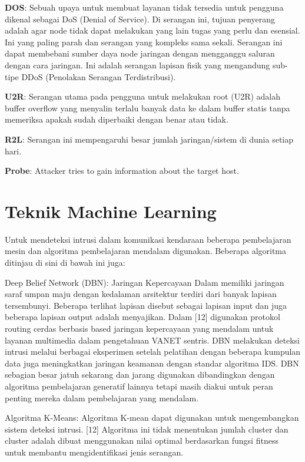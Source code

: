 \documentclass[conference]{IEEEtran}
\begin{document}
\textbf{DOS}: Sebuah upaya untuk membuat layanan
tidak tersedia untuk pengguna dikenal sebagai DoS (Denial of Service). Di
serangan ini, tujuan penyerang adalah agar node tidak dapat melakukan yang lain
tugas yang perlu dan esensial. Ini yang paling parah dan
serangan yang kompleks sama sekali. Serangan ini dapat membebani sumber daya
node jaringan dengan mengganggu saluran dengan cara jaringan.
Ini adalah serangan lapisan fisik yang mengandung sub-tipe DDoS
(Penolakan Serangan Terdistribusi).

\textbf{U2R}: Serangan utama pada pengguna untuk melakukan root
(U2R) adalah buffer overflow yang menyalin terlalu banyak data ke dalam
buffer statis tanpa memeriksa apakah sudah diperbaiki dengan benar atau tidak.

\textbf{R2L}: Serangan ini mempengaruhi besar jumlah jaringan/sistem di dunia setiap hari.

\textbf{Probe}: Attacker tries to gain information about 
the target host.

\section{Teknik Machine Learning}
Untuk mendeteksi intrusi dalam komunikasi kendaraan beberapa
pembelajaran mesin dan algoritma pembelajaran mendalam digunakan.
Beberapa algoritma ditinjau di sini di bawah ini juga:

Deep Belief Network (DBN): Jaringan Kepercayaan Dalam
memiliki jaringan saraf umpan maju dengan kedalaman
arsitektur terdiri dari banyak lapisan tersembunyi. Beberapa terlihat
lapisan disebut sebagai lapisan input dan juga beberapa lapisan output adalah
menyajikan. Dalam [12]\cite{olusola2010analysis} digunakan protokol routing cerdas berbasis based
jaringan kepercayaan yang mendalam untuk layanan multimedia dalam pengetahuan
VANET sentris. DBN melakukan deteksi intrusi
melalui berbagai eksperimen setelah pelatihan dengan beberapa
kumpulan data juga meningkatkan jaringan keamanan dengan standar
algoritma IDS. DBN sebagian besar jatuh sekarang dan
jarang digunakan dibandingkan dengan algoritma pembelajaran generatif lainnya
tetapi masih diakui untuk peran penting mereka dalam pembelajaran yang mendalam.

Algoritma K-Means: Algoritma K-mean dapat digunakan
untuk mengembangkan sistem deteksi intrusi. [12]\cite{zhang2018intelligent} Algoritma ini
tidak menentukan jumlah cluster dan cluster adalah
dibuat menggunakan nilai optimal berdasarkan fungsi fitness untuk
membantu mengidentifikasi jenis serangan.
\end{document}
